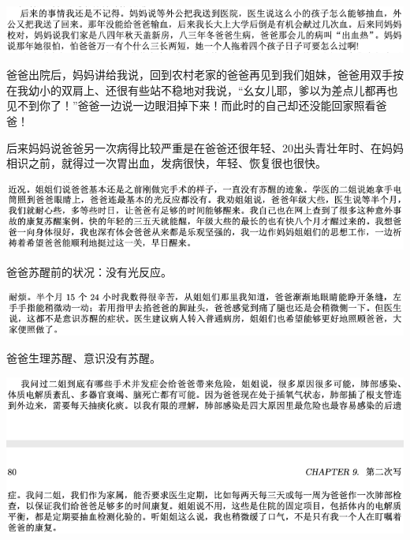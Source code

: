 \documentclass[9pt, b5paper]{article}
\begin{document}
\begin{center}
\includegraphics[width=.9\linewidth]{./pic/backups_plans_20210417_104955.png}
\end{center}

爸爸出院后，妈妈讲给我说，回到农村老家的爸爸再见到我们姐妹，爸爸用双手按在我幼小的双肩上、还很有些站不稳地对我说，“幺女儿耶，爹以为差点儿都再也见不到你了！”爸爸一边说一边眼泪掉下来！而此时的自己却还没能回家照看爸爸！

后来妈妈说爸爸另一次病得比较严重是在爸爸还很年轻、20出头青壮年时、在妈妈相识之前，就得过一次胃出血，发病很快，年轻、恢复很也很快。 

\begin{center}
\includegraphics[width=.9\linewidth]{./pic/backups_plans_20210416_161016.png}
\end{center}

爸爸苏醒前的状况：没有光反应。

\begin{center}
\includegraphics[width=.9\linewidth]{./pic/backups_plans_20210416_161213.png}
\end{center}

爸爸生理苏醒、意识没有苏醒。

\begin{center}
\includegraphics[width=.9\linewidth]{./pic/backups_plans_20210416_161400.png}
\end{center}
\end{document}

